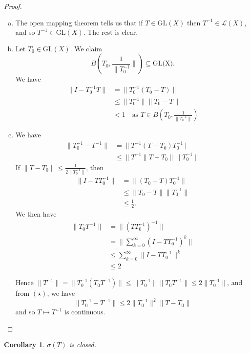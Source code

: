 \documentclass[10pt, oneside, reqno]{amsart}
\theoremstyle{plain}%
\newtheorem*{cor}{Corollary}
\theoremstyle{definition}
\theoremstyle{remark}
\begin{document}
\begin{proof}
	\begin{enumerate}[(a)]
		\item The open mapping theorem tells us that if $T \in \text{GL}(X)$ then $T^{-1} \in \mathcal L(X)$, and so $T^{-1} \in \text{GL}(X)$.  The rest is clear.
		\item Let $T_0 \in \text{GL}(X)$.  We claim \[
			B\left(T_0, \frac{1}{\| T_0^{-1}} \|\right) \subseteq \text{GL(X)}.
		\]  We have \begin{align*}
			\| I - T_0^{-1} T \| 	&= \| T_0^{-1}(T_0 - T) \| \\ 
									&\leq \| T_0^{-1} \| \| T_0 - T \| \\
									&< 1 \quad \text{as $T \in B\left(T_0, \frac{1}{\| T_0^{-1} \|}\right) $}
		\end{align*}
		\item We have \begin{align*}
			\| T_0^{-1} - T^{-1} \| &= \| T^{-1} ( T - T_0) T_0^{-1} \ | \\
									&\leq \| T^{-1} \| T - T_0 \| \| T_0^{-1} \| \tag{$\star$}
		\end{align*}  If $\| T - T_0 \| \leq \frac{1}{2 \| T_0^{-1} \|}$, then 
		\begin{align*}
			\| I - T T_0^{-1} \| &= \| (T_0 - T) T_0^{-1} \| \\
								&\leq \| T_0 - T \| \| T_0^{-1} \| \\
								&\leq \frac{1}{2}.
		\end{align*}  We then have 
		\begin{align*}
			\| T_0 T^{-1} \| 	&= \| (T T_0^{-1})^{-1} \| \\
								&= \| \sum_{k=0}^\infty ( I - T T_0^{-1})^k \| \\
								&\leq \sum_{k=0}^\infty \| I - T T_0^{-1} \|^k \\
								&\leq 2
		\end{align*} 
		
		Hence $\|T^{-1}\| = \|T_0^{-1}( T_0 T^{-1}) \| \leq \| T_0^{-1} \| \| T_0 T^{-1} \| \leq 2 \| T_0^{-1} \|$, and from $(\star)$, we have \[
			\| T_0^{-1} - T^{-1} \| \leq 2 \| T_0^{-1} \|^2 \| T - T_0 \|
		\] and so $T \mapsto T^{-1}$ is continuous.  
	\end{enumerate}
\end{proof}

\begin{cor}
	$\sigma(T)$ is closed.
\end{cor}
\end{document}
